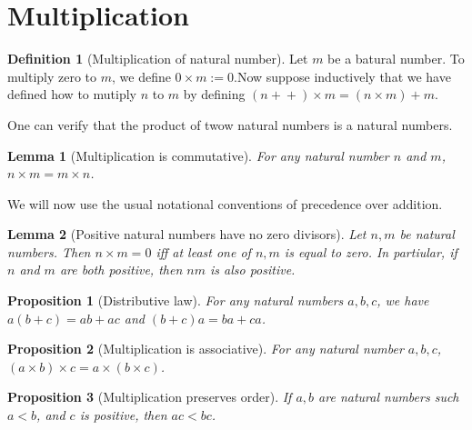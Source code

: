 \documentclass[
]{book}
\newtheorem{lemma}{Lemma}[chapter]
\newtheorem{proposition}{Proposition}[chapter]
\theoremstyle{definition}
\newtheorem{definition}{Definition}[chapter]
\theoremstyle{definition}
\theoremstyle{definition}
\theoremstyle{definition}
\theoremstyle{remark}
\begin{document}
\section{Multiplication}\label{multiplication}

\begin{definition}[Multiplication of natural number]
\protect\hypertarget{def:multiplication}{}\label{def:multiplication}Let \(m\) be a batural number. To multiply zero to \(m\), we define \(0\times m:=0\).Now suppose inductively that we have defined how to mutiply \(n\) to \(m\) by defining \((n+\!\!+)\times m =(n\times m)+m\).
\end{definition}

One can verify that the product of twow natural numbers is a natural numbers.

\begin{lemma}[Multiplication is commutative]
\protect\hypertarget{lem:multicommutative}{}\label{lem:multicommutative}For any natural number \(n\) and \(m\), \(n\times m = m\times n\).
\end{lemma}

We will now use the usual notational conventions of precedence over addition.

\begin{lemma}[Positive natural numbers have no zero divisors]
\protect\hypertarget{lem:zerodivisors}{}\label{lem:zerodivisors}Let \(n,m\) be natural numbers. Then \(n\times m= 0\) iff at least one of \(n,m\) is equal to zero. In partiular, if \(n\) and \(m\) are both positive, then \(nm\) is also positive.
\end{lemma}

\begin{proposition}[Distributive law]
\protect\hypertarget{prp:distribution}{}\label{prp:distribution}For any natural numbers \(a,b,c\), we have \(a(b+c) = ab+ac\) and \((b+c)a = ba +ca\).
\end{proposition}

\begin{proposition}[Multiplication is associative]
\protect\hypertarget{prp:multiassociative}{}\label{prp:multiassociative}For any natural number \(a,b,c\), \((a\times b)\times c = a\times(b\times c)\).
\end{proposition}

\begin{proposition}[Multiplication preserves order]
\protect\hypertarget{prp:multiorder}{}\label{prp:multiorder}If \(a,b\) are natural numbers such \(a<b\), and \(c\) is positive, then \(ac<bc\).
\end{proposition}
\end{document}
